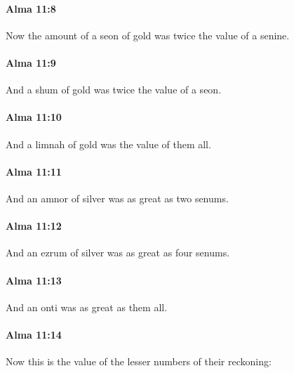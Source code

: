 		\paragraph{Alma 11:8} %
			\label{ALMA-11-8}

			Now the amount of a seon of gold was twice the value of a senine.

		\paragraph{Alma 11:9} %
			\label{ALMA-11-9}

			And a shum of gold was twice the value of a seon.

		\paragraph{Alma 11:10} %
			\label{ALMA-11-10}

			And a limnah of gold was the value of them all.

		\paragraph{Alma 11:11} %
			\label{ALMA-11-11}

			And an amnor of silver was as great as two senums.

		\paragraph{Alma 11:12} %
			\label{ALMA-11-12}

			And an ezrum of silver was as great as four senums.

		\paragraph{Alma 11:13} %
			\label{ALMA-11-13}

			And an onti was as great as them all.

		\paragraph{Alma 11:14} %
			\label{ALMA-11-14}

			Now this is the value of the lesser numbers of their reckoning:

